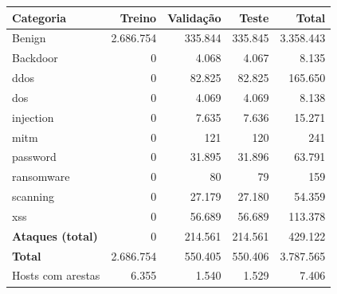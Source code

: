 \begin{tabular}{lrrrr}
\toprule
Categoria & Treino & Validação & Teste & Total \\
\midrule
Benign & 2.686.754 & 335.844 & 335.845 & 3.358.443 \\
Backdoor & 0 & 4.068 & 4.067 & 8.135 \\
ddos & 0 & 82.825 & 82.825 & 165.650 \\
dos & 0 & 4.069 & 4.069 & 8.138 \\
injection & 0 & 7.635 & 7.636 & 15.271 \\
mitm & 0 & 121 & 120 & 241 \\
password & 0 & 31.895 & 31.896 & 63.791 \\
ransomware & 0 & 80 & 79 & 159 \\
scanning & 0 & 27.179 & 27.180 & 54.359 \\
xss & 0 & 56.689 & 56.689 & 113.378 \\
\midrule
\textbf{Ataques (total)} & 0 & 214.561 & 214.561 & 429.122 \\
\textbf{Total} & 2.686.754 & 550.405 & 550.406 & 3.787.565 \\
\midrule
Hosts com arestas & 6.355 & 1.540 & 1.529 & 7.406 \\
\bottomrule
\end{tabular}
